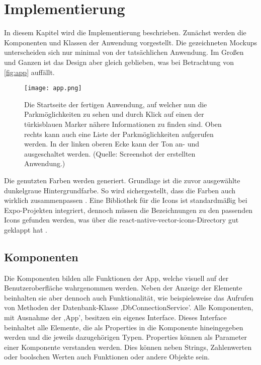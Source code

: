 \chapter{Implementierung}
\label{implementierung}
\renewcommand{\arraystretch}{2}

In diesem Kapitel wird die Implementierung beschrieben. Zunächst werden die Komponenten und Klassen der Anwendung vorgestellt. Die gezeichneten Mockups unterscheiden sich nur minimal von der tatsächlichen Anwendung. Im Großen und Ganzen ist das Design aber gleich geblieben, was bei Betrachtung von \autoref{fig:app} auffällt.

\begin{figure}[h!]
	\centering
	\texttt{[image: app.png]}
	\caption[Die Startseite der fertigen Anwendung, auf welcher nun die Parkmöglichkeiten zu sehen und durch Klick auf einen der türkisblauen Marker nähere Informationen zu finden sind. Oben rechts kann auch eine Liste der Parkmöglichkeiten aufgerufen werden. In der linken oberen Ecke kann der Ton an- und ausgeschaltet werden.]
	{Die Startseite der fertigen Anwendung, auf welcher nun die Parkmöglichkeiten zu sehen und durch Klick auf einen der türkisblauen Marker nähere Informationen zu finden sind. Oben rechts kann auch eine Liste der Parkmöglichkeiten aufgerufen werden. In der linken oberen Ecke kann der Ton an- und ausgeschaltet werden. (Quelle: Screenshot der erstellten Anwendung.)}
	\label{fig:app}
\end{figure}
\newpage

Die genutzten Farben werden generiert. Grundlage ist die zuvor ausgewählte dunkelgraue Hintergrundfarbe. So wird sichergestellt, dass die Farben auch wirklich zusammenpassen \cite{colors}. Eine Bibliothek für die Icons ist standardmäßig bei Expo-Projekten integriert, dennoch müssen die Bezeichnungen zu den passenden Icons gefunden werden, was über die react-native-vector-icons-Directory gut geklappt hat \cite{icons}.
\section{Komponenten}
Die Komponenten bilden alle Funktionen der App, welche visuell auf der Benutzeroberfläche wahrgenommen werden. Neben der Anzeige der Elemente beinhalten sie aber dennoch auch Funktionalität, wie beispielsweise das Aufrufen von Methoden der Datenbank-Klasse ,DbConnectionService'. Alle Komponenten, mit Ausnahme der ,App', besitzen ein eigenes Interface. Dieses Interface beinhaltet alle Elemente, die als Properties in die Komponente hineingegeben werden und die jeweils dazugehörigen Typen. Properties können als Parameter einer Komponente verstanden werden. Dies können neben Strings, Zahlenwerten oder boolschen Werten auch Funktionen oder andere Objekte sein.
